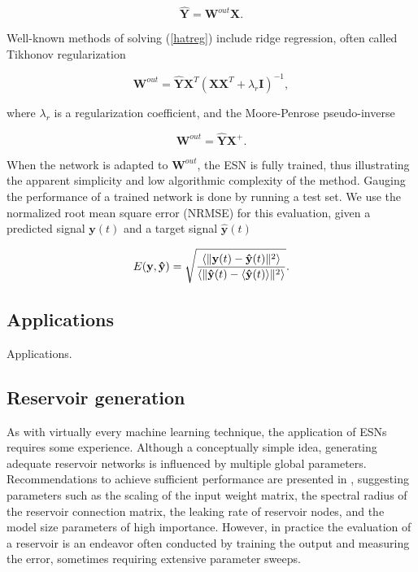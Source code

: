 \begin{equation}
  \mathbf{\hat{Y}} = \mathbf{W}^{out}\mathbf{X}.
  \label{hatreg}
\end{equation}

Well-known methods of solving (\ref{hatreg}) include ridge regression, often
called Tikhonov regularization

\begin{equation}
  \mathbf{W}^{out} = \mathbf{\hat{Y}}\mathbf{X}^{T}
                    (\mathbf{X}\mathbf{X}^{T} + \lambda_{r}\mathbf{I})^{-1},
  \label{tikhonov}
\end{equation}

\noindent where $\lambda_{r}$ is a regularization coefficient, and the
Moore-Penrose pseudo-inverse

\begin{equation}
  \mathbf{W}^{out} = \mathbf{\hat{Y}}\mathbf{X}^{+}.
  \label{pseudo}
\end{equation}

When the network is adapted to $\mathbf{W}^{out}$, the ESN is fully trained,
thus illustrating the apparent simplicity and low algorithmic complexity of the
method. Gauging the performance of a trained network is done by running a test
set. We use the normalized root mean square error (NRMSE) for this evaluation,
given a predicted signal $\mathbf{y}(t)$ and a target signal
$\mathbf{\hat{y}}(t)$

\begin{equation}
  E(\mathbf{y}, \mathbf{\hat{y}}) = \sqrt{\frac{
      \langle\Vert \mathbf{y}(t) - \mathbf{\hat{y}}(t) \Vert^{2}\rangle
    }{
      \langle\Vert \mathbf{\hat{y}}(t) - \langle\mathbf{\hat{y}}(t)\rangle \Vert^{2}\rangle
    }
  }
  .
  \label{nrmse}
\end{equation}


\subsection{Applications}

Applications.

\subsection{Reservoir generation}

As with virtually every machine learning technique, the application of ESNs
requires some experience. Although a conceptually simple idea, generating
adequate reservoir networks is influenced by multiple global
parameters. Recommendations to achieve sufficient performance are presented in
\cite{montavon_practical_2012, jaeger_tutorial_nodate}, suggesting parameters
such as the scaling of the input weight matrix, the spectral radius of the
reservoir connection matrix, the leaking rate of reservoir nodes, and the model
size parameters of high importance. However, in practice the evaluation of a
reservoir is an endeavor often conducted by training the output and measuring
the error, sometimes requiring extensive parameter sweeps.

